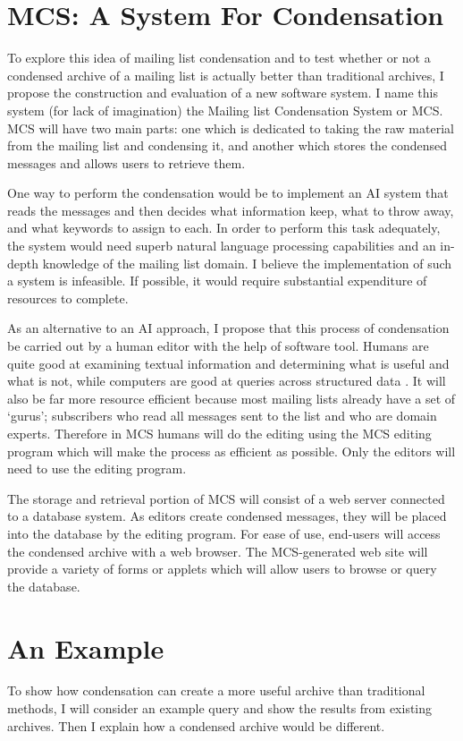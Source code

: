 \section{MCS: A System For Condensation}
To explore this idea of mailing list condensation and to test whether or not a
condensed archive of a mailing list is actually better than traditional
archives, I propose the construction and evaluation of a new software system.
I name this system (for lack of imagination) the Mailing list Condensation
System or MCS. MCS will have two main parts: one which is dedicated to taking
the raw material from the mailing list and condensing it, and another which
stores the condensed messages and allows users to retrieve them.

One way to perform the condensation would be to implement an AI system that
reads the messages and then decides what information keep, what to throw away,
and what keywords to assign to each. In order to perform this task adequately,
the system would need superb natural language processing capabilities and an
in-depth knowledge of the mailing list domain. I believe the implementation of
such a system is infeasible. If possible, it would require substantial
expenditure of resources to complete.

As an alternative to an AI approach, I propose that this process of
condensation be carried out by a human editor with the help of software tool.
Humans are quite good at examining textual information and determining what is
useful and what is not, while computers are good at queries across structured
data \cite{Brooks:1996:CST}. It will also be far more resource efficient
because most mailing lists already have a set of `gurus'; subscribers who read
all messages sent to the list and who are domain experts.  Therefore in MCS
humans will do the editing using the MCS editing program which will make the
process as efficient as possible. Only the editors will need to use the editing
program.

The storage and retrieval portion of MCS will consist of a web server connected
to a database system. As editors create condensed messages, they will be placed
into the database by the editing program. For ease of use, end-users will
access the condensed archive with a web browser. The MCS-generated web site
will provide a variety of forms or applets which will allow users to browse or
query the database.

\section{An Example}
\label{sec:example}
To show how condensation can create a more useful archive than traditional
methods, I will consider an example query and show the results from
existing archives. Then I explain how a condensed archive would be different.

